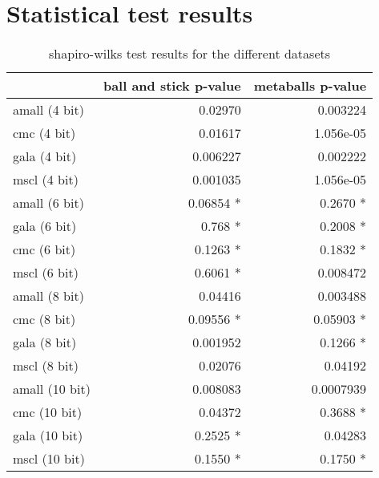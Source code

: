 \chapter{Statistical test results}
\label{cha:statsresults}

\begin{table}[h!]
  \begin{tabular}{ | l | r | r | }
  \hline
                 & ball and stick p-value & metaballs p-value  \\ \hline
  amall (4 bit)  &                0.02970 &          0.003224  \\ \hline
  cmc (4 bit)    &                0.01617 &         1.056e-05  \\ \hline
  gala (4 bit)   &               0.006227 &          0.002222  \\ \hline
  mscl (4 bit)   &               0.001035 &         1.056e-05  \\ \hline
  \hline

  amall (6 bit)  &              0.06854 * &          0.2670 *  \\ \hline
  gala (6 bit)   &                0.768 * &          0.2008 *  \\ \hline
  cmc (6 bit)    &               0.1263 * &          0.1832 *  \\ \hline
  mscl (6 bit)   &               0.6061 * &          0.008472  \\ \hline
  \hline

  amall (8 bit)  &                0.04416 &          0.003488  \\ \hline
  cmc (8 bit)    &              0.09556 * &         0.05903 *  \\ \hline
  gala (8 bit)   &               0.001952 &          0.1266 *  \\ \hline
  mscl (8 bit)   &                0.02076 &           0.04192  \\ \hline
  \hline

  amall (10 bit) &               0.008083 &         0.0007939  \\ \hline
  cmc (10 bit)   &                0.04372 &          0.3688 *  \\ \hline
  gala (10 bit)  &               0.2525 * &           0.04283  \\ \hline
  mscl (10 bit)  &               0.1550 * &          0.1750 *  \\ \hline
  \end{tabular}
  \caption{shapiro-wilks test results for the different datasets}
  \label{tab:dataset_normality}
\end{table}

